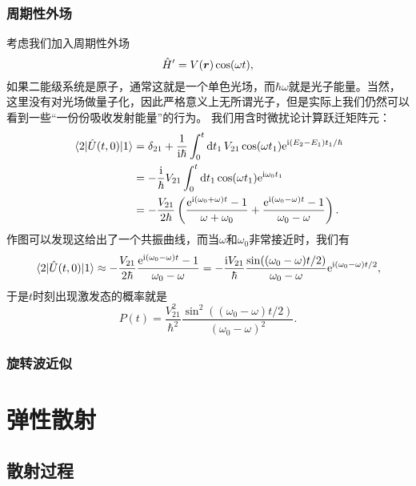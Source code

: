 \documentclass[UTF8, a4paper]{ctexart}
\newcommand*{\ee}{\mathrm{e}}
\newcommand*{\ii}{\mathrm{i}}
\begin{document}
\subsubsection{周期性外场}

考虑我们加入周期性外场
\begin{equation}
    \hat{H}' = V(\vb*{r}) \cos(\omega t),
\end{equation}
如果二能级系统是原子，通常这就是一个单色光场，而$\hbar \omega$就是光子能量。当然，这里没有对光场做量子化，因此严格意义上无所谓光子，但是实际上我们仍然可以看到一些“一份份吸收发射能量”的行为。
我们用含时微扰论计算跃迁矩阵元：
\begin{equation}
    \begin{aligned}
        \mel*{2}{\hat{U}(t, 0)}{1} &= \delta_{21} + \frac{1}{\ii \hbar} \int_0^t \dd{t_1} V_{21} \cos(\omega t_1) \ee^{\ii (E_2 - E_1) t_1 / \hbar} \\
        &= - \frac{\ii}{\hbar} V_{21} \int_0^t \dd{t_1} \cos(\omega t_1) \ee^{\ii \omega_0 t_1} \\
        &= - \frac{V_{21}}{2 \hbar} \left( \frac{\ee^{\ii (\omega_0 + \omega) t} - 1}{\omega + \omega_0} + \frac{\ee^{\ii (\omega_0 - \omega) t} - 1}{\omega_0 - \omega} \right).
    \end{aligned}
\end{equation}
作图可以发现这给出了一个共振曲线，而当$\omega$和$\omega_0$非常接近时，我们有
\begin{equation}
    \mel*{2}{\hat{U}(t, 0)}{1} \approx - \frac{V_{21}}{2 \hbar} \frac{\ee^{\ii (\omega_0 - \omega) t} - 1}{\omega_0 - \omega} = - \frac{\ii V_{21}}{\hbar} \frac{\sin((\omega_0-\omega)t/2)}{\omega_0 - \omega} \ee^{\ii (\omega_0 - \omega) t / 2},
\end{equation}
于是$t$时刻出现激发态的概率就是
\begin{equation}
    P(t) = \frac{V_{21}^2}{\hbar^2} \frac{\sin^2((\omega_0 - \omega) t /2)}{(\omega_0 - \omega)^2}.
\end{equation}

\subsubsection{旋转波近似}



\section{弹性散射}

\subsection{散射过程}
\end{document}
